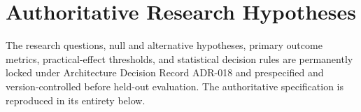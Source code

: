 \section{Authoritative Research Hypotheses}
The research questions, null and alternative hypotheses, primary outcome metrics, practical-effect thresholds, and statistical decision rules are permanently locked under Architecture Decision Record ADR-018 and prespecified and version-controlled before held-out evaluation. The authoritative specification is reproduced in its entirety below.


